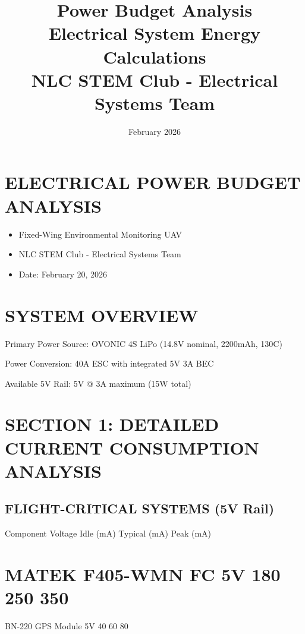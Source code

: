\documentclass[11pt,letterpaper]{article}
\title{\Huge\textbf{Power Budget Analysis}\\
\Large Electrical System Energy Calculations\\
\large NLC STEM Club - Electrical Systems Team}
\author{February 2026}
\date{}
\begin{document}
\maketitle
\thispagestyle{empty}
\newpage
\section{ELECTRICAL POWER BUDGET ANALYSIS}

\begin{itemize}
  \item Fixed-Wing Environmental Monitoring UAV
  \item NLC STEM Club - Electrical Systems Team
  \item Date: February 20, 2026
\end{itemize}

\section{SYSTEM OVERVIEW}

Primary Power Source: OVONIC 4S LiPo (14.8V nominal, 2200mAh, 130C)\par

Power Conversion:     40A ESC with integrated 5V 3A BEC\par

Available 5V Rail:    5V @ 3A maximum (15W total)\par

\section{SECTION 1: DETAILED CURRENT CONSUMPTION ANALYSIS}

\subsection*{FLIGHT-CRITICAL SYSTEMS (5V Rail)}

Component               Voltage    Idle (mA)   Typical (mA)   Peak (mA)\par

\section{MATEK F405-WMN FC         5V          180          250           350}

BN-220 GPS Module         5V           40           60            80\par
\end{document}
